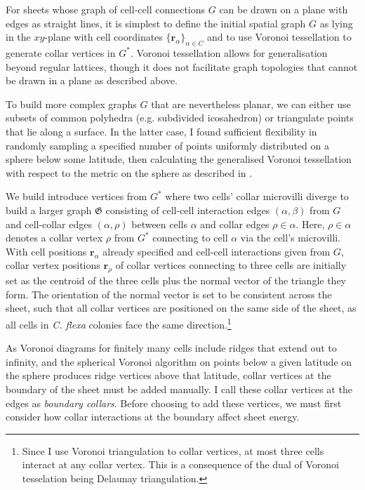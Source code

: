 For sheets whose graph of cell-cell connections $G$ can be drawn on a plane with edges as straight lines, it is simplest to define the initial spatial graph $G$ as lying in the $xy$-plane with cell coordinates $\{\bm{r}_\alpha\}_{\alpha\in C}$ and to use Voronoi tessellation to generate collar vertices in $G^*$. Voronoi tessellation allows for generalisation beyond regular lattices, though it does not facilitate graph topologies that cannot be drawn in a plane as described above. 

To build more complex graphs $G$ that are nevertheless planar, we can either use subsets of common polyhedra (e.g. subdivided icosahedron) or triangulate points that lie along a surface. In the latter case, I found sufficient flexibility in randomly sampling a specified number of points uniformly distributed on a sphere below some latitude, then calculating the generalised Voronoi tessellation with respect to the metric on the sphere as described in \citet{caroli2010}.

We build introduce vertices from $G^*$ where two cells' collar microvilli diverge to build a larger graph $\mathfrak{G}$ consisting of cell-cell interaction edges $(\alpha, \beta)$ from $G$ and cell-collar edges $(\alpha, \rho)$ between cells $\alpha$ and collar edges $\rho \in \alpha$. Here, $\rho \in \alpha$ denotes a collar vertex $\rho$ from $G^*$ connecting to cell $\alpha$ via the cell's microvilli. With cell positions $\bm{r}_\alpha$ already specified and cell-cell interactions given from $G$, collar vertex positions $\bm{r}_\rho$ of collar vertices connecting to three cells are initially set as the centroid of the three cells plus the normal vector of the triangle they form. The orientation of the normal vector is set to be consistent across the sheet, such that all collar vertices are positioned on the same side of the sheet, as all cells in \textit{C. flexa} colonies face the same direction.\footnote{Since I use Voronoi triangulation to collar vertices, at most three cells interact at any collar vertex. This is a consequence of the dual of Voronoi tesselation being Delaunay triangulation.}

As Voronoi diagrams for finitely many cells include ridges that extend out to infinity, and the spherical Voronoi algorithm on points below a given latitude on the sphere produces ridge vertices above that latitude, collar vertices at the boundary of the sheet must be added manually. I call these collar vertices at the edges as \textit{boundary collars}. Before choosing to add these vertices, we must first consider how collar interactions at the boundary affect sheet energy.

